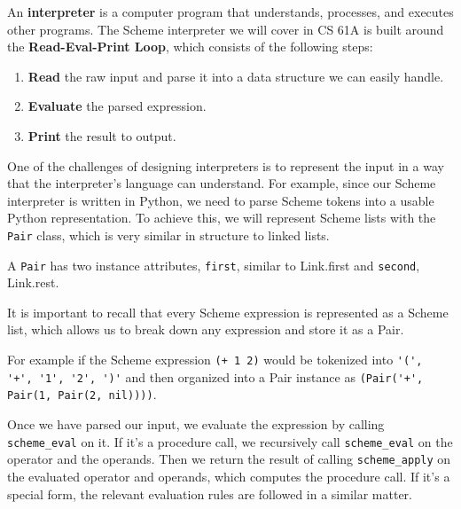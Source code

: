 An \textbf{interpreter} is a computer program that understands, processes, and executes other programs. The Scheme interpreter we will cover in CS 61A is built around the \textbf{Read-Eval-Print Loop}, which consists of the following steps:
\begin{enumerate}
    \item \textbf{Read} the raw input and parse it into a data structure we can easily handle. 
    \item \textbf{Evaluate} the parsed expression. 
    \item \textbf{Print} the result to output. 
\end{enumerate}

One of the challenges of designing interpreters is to represent the input in a way that the interpreter's language can understand.
For example, since our Scheme interpreter is written in Python, we need to parse Scheme tokens into a usable Python representation.
To achieve this, we will represent Scheme lists with the \lstinline{Pair} class, which is very similar in structure to linked lists.

A \lstinline{Pair} has two instance attributes, \lstinline{first}, similar to Link.first and \lstinline{second}, Link.rest.

It is important to recall that every Scheme expression is represented as a Scheme list, which allows us to break down any expression and store it as a Pair.

For example if the Scheme expression \lstinline{(+ 1 2)} would be tokenized into \lstinline{'(', '+', '1', '2', ')'} and then organized into a Pair instance as \lstinline{(Pair('+', Pair(1, Pair(2, nil))))}. 

Once we have parsed our input, we evaluate the expression by calling \lstinline{scheme_eval} on it. If it's a procedure call, we recursively call \lstinline{scheme_eval} on the operator and the operands. Then we return the result of calling \lstinline{scheme_apply} on the evaluated operator and operands, which computes the procedure call. If it's a special form, the relevant evaluation rules are followed in a similar matter.

